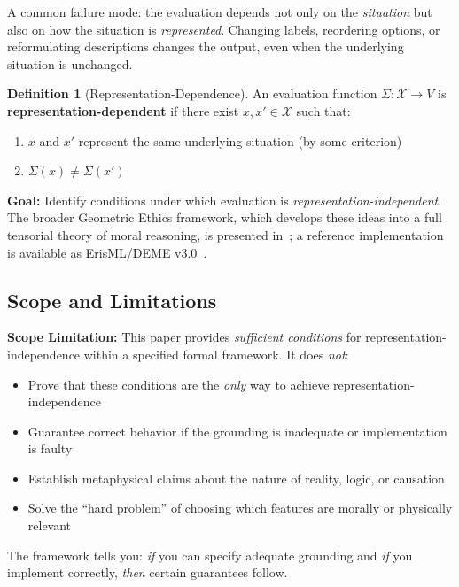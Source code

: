 \documentclass[12pt]{article}
\theoremstyle{definition}
\newtheorem{definition}[theorem]{Definition}
\theoremstyle{remark}
\newcommand{\calX}{\mathcal{X}}
\begin{document}
A common failure mode: the evaluation depends not only on the \emph{situation} but also on how
the situation is \emph{represented}. Changing labels, reordering options, or reformulating descriptions
changes the output, even when the underlying situation is unchanged.

\begin{definition}[Representation-Dependence]\label{def:rep-dep}
An evaluation function $\Sigma : \calX \to V$ is \textbf{representation-dependent} if there exist $x, x' \in \calX$ such that:
\begin{enumerate}
    \item $x$ and $x'$ represent the same underlying situation (by some criterion)
    \item $\Sigma(x) \neq \Sigma(x')$
\end{enumerate}
\end{definition}

\textbf{Goal:} Identify conditions under which evaluation is \emph{representation-independent}. The broader Geometric Ethics framework, which develops these ideas into a full tensorial theory of moral reasoning, is presented in~\cite{bond2026ge}; a reference implementation is available as ErisML/DEME v3.0~\cite{bond2026erisml}.

\subsection{Scope and Limitations}

\textbf{Scope Limitation:} This paper provides \emph{sufficient conditions} for representation-independence
within a specified formal framework. It does \emph{not}:

\begin{itemize}
    \item Prove that these conditions are the \emph{only} way to achieve representation-independence
    \item Guarantee correct behavior if the grounding is inadequate or implementation is faulty
    \item Establish metaphysical claims about the nature of reality, logic, or causation
    \item Solve the ``hard problem'' of choosing which features are morally or physically relevant
\end{itemize}

The framework tells you: \emph{if} you can specify adequate grounding and \emph{if} you implement
correctly, \emph{then} certain guarantees follow.
\end{document}
